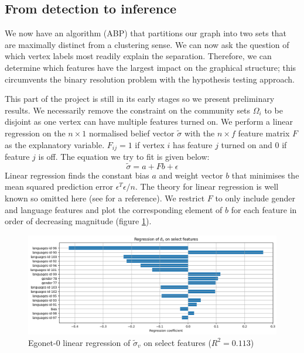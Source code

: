 \documentclass[11pt]{article}
\begin{document}
\begin{multicols*}{2}
\subsection{From detection to inference}
\label{sect:detection-to-inference}

We now have an algorithm (ABP) that partitions our graph into two sets that are maximally distinct from a clustering sense. We can now ask the question of which vertex labels most readily explain the separation. Therefore, we can determine which features have the largest impact on the graphical structure; this circumvents the binary resolution problem with the hypothesis testing approach.

This part of the project is still in its early stages so we present preliminary results. We necessarily remove the constraint on the community sets $\Omega_i$ to be disjoint as one vertex can have multiple features turned on. We perform a linear regression on the $n \times 1$ normalised belief vector $\tilde{\sigma}$ with the $n \times f$ feature matrix $F$ as the explanatory variable. $F_{ij} = 1$ if vertex $i$ has feature $j$ turned on and $0$ if feature $j$ is off. The equation we try to fit is given below:
%
\begin{equation}
	\tilde{\sigma} = a + F b + \epsilon
	\label{eqn:lin-regression}
\end{equation}
%
Linear regression finds the constant bias $a$ and weight vector $b$ that minimises the mean squared prediction error $\epsilon^T \epsilon / n$. The theory for linear regression is well known so omitted here (see \cite{yale-linear-regression} for a reference). We restrict $F$ to only include gender and language features and plot the corresponding element of $b$ for each feature in order of decreasing magnitude (figure \ref{fig:abp-output-lin-regression}).
%
\begin{figure}[H]
	\includegraphics[width=\linewidth]{ego-0-abp-lin-regression.png}
	\caption{Egonet-0 linear regression of $\tilde{\sigma}_v$ on select features ($R^2 = 0.113$)}
	\label{fig:abp-output-lin-regression}
\end{figure}


\end{multicols*}
\end{document}
